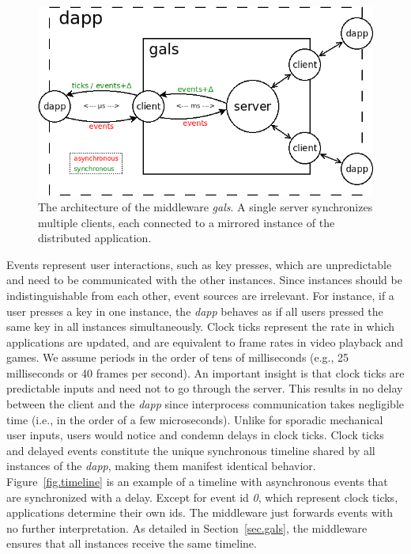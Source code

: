 \documentclass[sigplan,screen]{acmart}
\newcommand{\dapp}{\emph{dapp}\xspace}
\begin{document}
\begin{figure}[t]
  \centering
  \includegraphics[width=\linewidth]{middleware}
  \caption{
    \label{fig.middleware}
    The architecture of the middleware \emph{gals}.
    A single server synchronizes multiple clients, each connected to a mirrored
    instance of the distributed application.
  }
\end{figure}

Events represent user interactions, such as key presses, which are
unpredictable and need to be communicated with the other instances.
Since instances should be indistinguishable from each other, event sources are
irrelevant.
For instance, if a user presses a key in one instance, the \dapp behaves as if
all users pressed the same key in all instances simultaneously.
%
Clock ticks represent the rate in which applications are updated, and are
equivalent to frame rates in video playback and games.
We assume periods in the order of tens of milliseconds (e.g., 25 milliseconds
or 40 frames per second).
An important insight is that clock ticks are predictable inputs and need not to
go through the server.
This results in no delay between the client and the \dapp since interprocess
communication takes negligible time (i.e., in the order of a few microseconds).
Unlike for sporadic mechanical user inputs, users would notice and condemn
delays in clock ticks.
%
Clock ticks and delayed events constitute the unique synchronous timeline
shared by all instances of the \dapp, making them manifest identical behavior.
Figure~\ref{fig.timeline} is an example of a timeline with asynchronous events
that are synchronized with a delay.
Except for event id \emph{0}, which represent clock ticks, applications
determine their own ids.
The middleware just forwards events with no further interpretation.
As detailed in Section~\ref{sec.gals}, the middleware ensures that all
instances receive the same timeline.
\end{document}
